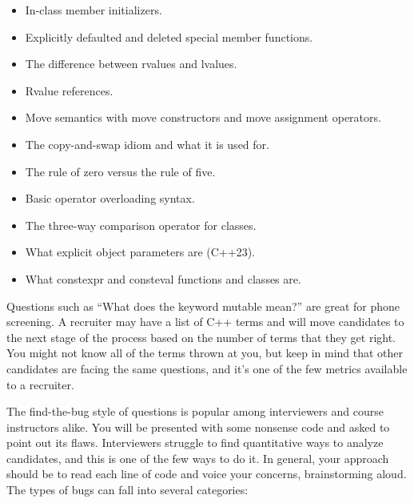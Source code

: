 \begin{itemize}
\item
In-class member initializers.

\item
Explicitly defaulted and deleted special member functions.

\item
The difference between rvalues and lvalues.

\item
Rvalue references.

\item
Move semantics with move constructors and move assignment operators.

\item
The copy-and-swap idiom and what it is used for.

\item
The rule of zero versus the rule of five.

\item
Basic operator overloading syntax.

\item
The three-way comparison operator for classes.

\item
What explicit object parameters are (C++23).

\item
What constexpr and consteval functions and classes are.
\end{itemize}


Questions such as “What does the keyword mutable mean?” are great for phone screening. A recruiter may have a list of C++ terms and will move candidates to the next stage of the process based on the number of terms that they get right. You might not know all of the terms thrown at you, but keep in mind that other candidates are facing the same questions, and it’s one of the few metrics available to a recruiter.

The find-the-bug style of questions is popular among interviewers and course instructors alike. You will be presented with some nonsense code and asked to point out its flaws. Interviewers struggle to find quantitative ways to analyze candidates, and this is one of the few ways to do it. In general, your approach should be to read each line of code and voice your concerns, brainstorming aloud. The types of bugs can fall into several categories:

